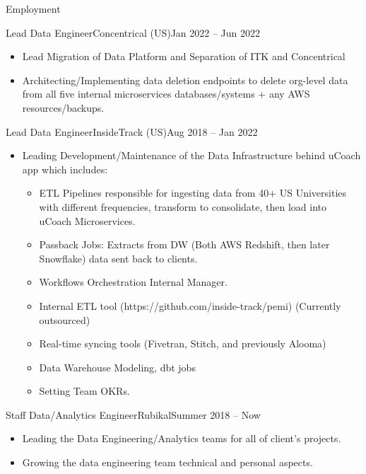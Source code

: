 \documentclass[]{ahmedamrcv}
\begin{document}
\begin{cvsection}{Employment}
		\begin{cvsubsection}{Lead Data Engineer}{Concentrical (US)}{Jan 2022 -- Jun 2022}
			\begin{itemize}
				\item Lead Migration of Data Platform and Separation of ITK and Concentrical
				\item Architecting/Implementing data deletion endpoints to delete org-level data from all five internal microservices databases/systems + any AWS resources/backups.
			\end{itemize}
		\end{cvsubsection}

		\begin{cvsubsection}{Lead Data Engineer}{InsideTrack (US)}{Aug 2018 -- Jan 2022}
			\begin{itemize}
				\item Leading Development/Maintenance of the Data Infrastructure behind uCoach app which includes:
				\begin{itemize}
					\item ETL Pipelines responsible for ingesting data from 40+ US Universities with different frequencies, transform to consolidate, then load into uCoach Microservices.
					\item Passback Jobs: Extracts from DW (Both AWS Redshift, then later Snowflake) data sent back to clients.
					\item Workflows Orchestration Internal Manager.
					\item Internal ETL tool (https://github.com/inside-track/pemi) (Currently outsourced)
					\item Real-time syncing tools (Fivetran, Stitch, and previously Alooma)
					\item Data Warehouse Modeling, dbt jobs
					\item Setting Team OKRs.
				\end{itemize}
			\end{itemize}
		\end{cvsubsection}

		\begin{cvsubsection}{Staff Data/Analytics Engineer}{Rubikal}{Summer 2018 -- Now}
			\begin{itemize}
				\item Leading the Data Engineering/Analytics teams for all of client's projects.
				\item Growing the data engineering team technical and personal aspects.
			\end{itemize}
		\end{cvsubsection}
		

\end{cvsection}
\end{document}
